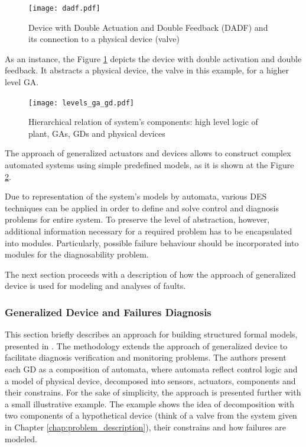 \begin{figure}[t]
	\centering
	\texttt{[image: dadf.pdf]}
	\caption{Device with Double Actuation and Double Feedback (DADF) and its
	connection to a physical device (valve)}
	\label{fig:dadf}
\end{figure}
 
As an instance, the Figure \ref{fig:dadf} depicts the device with double
activation and double feedback. It abstracts a physical device, the valve
in this example, for a higher level GA.

\begin{figure}[t]
	\centering
	\texttt{[image: levels\_ga\_gd.pdf]}
	\caption{Hierarchical relation of system's components: high level logic of
	plant, GAs, GDs and physical devices}
	\label{fig:levels_ga_gd}
\end{figure}

The approach of generalized actuators and devices allows to construct complex
automated systems using simple predefined models, as it is shown at the Figure
\ref{fig:levels_ga_gd}.
  
Due to representation of the system's models by automata, various DES techniques
can be applied in order to define and solve control and diagnosis problems for
entire system. To preserve the level of abstraction, however,
additional information necessary for a required problem has to be encapsulated
into modules. Particularly, possible failure behaviour should be incorporated
into modules for the diagnosability problem.

The next section proceeds with a description of how the approach of generalized
device is used for modeling and analyses of faults.


\subsubsection{Generalized Device and Failures Diagnosis}

This section briefly describes an approach for building structured formal
models, presented in \cite{sartini_methodology_2010}. The methodology extends
the approach of generalized device to facilitate diagnosis verification
and monitoring problems. The authors present each GD as a composition of
automata, where automata reflect control logic and a model of physical device,
decomposed into sensors, actuators, components and their constrains. For the
sake of simplicity, the approach is presented further with a small illustrative
example. The example shows the idea of decomposition with two components of a
hypothetical device (think of a valve from the system given in Chapter
\ref{chap:problem_description}), their constrains and how failures are modeled.

